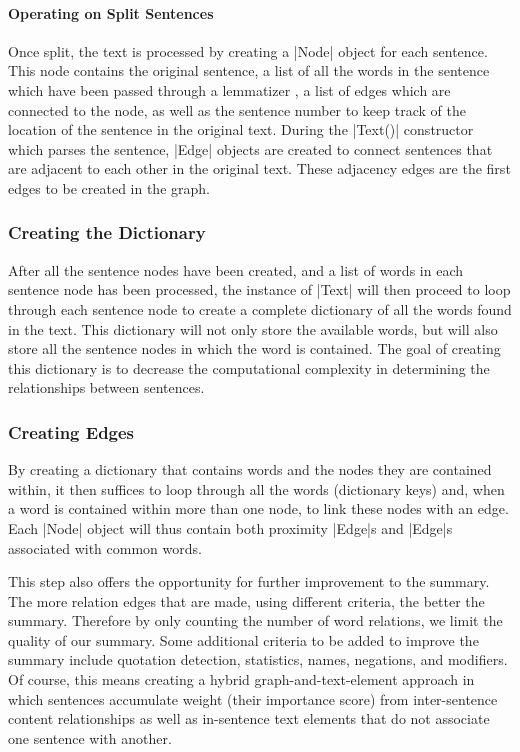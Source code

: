 	\paragraph{Operating on Split Sentences}
		Once split, the text is processed by creating a |Node| object for each sentence. This node contains the original sentence, a list of all the words in the sentence which have been passed through a lemmatizer \cite{nltk}, a list of edges which are connected to the node, as well as the sentence number to keep track of the location of the sentence in the original text. During the |Text()| constructor which parses the sentence, |Edge| objects are created to connect sentences that are adjacent to each other in the original text. These adjacency edges are the first edges to be created in the graph.
	
	\subsubsection{Creating the Dictionary}
		After all the sentence nodes have been created, and a list of words in each sentence node has been processed, the instance of |Text| will then proceed to loop through each sentence node to create a complete dictionary of all the words found in the text. This dictionary will not only store the available words, but will also store all the sentence nodes in which the word is contained. The goal of creating this dictionary is to decrease the computational complexity in determining the relationships between sentences. 
		
	\subsubsection{Creating Edges}
		By creating a dictionary that contains words and the nodes they are contained within, it then suffices to loop through all the words (\ie dictionary keys) and, when a word is contained within more than one node, to link these nodes with an edge. Each |Node| object will thus contain both proximity |Edge|s and |Edge|s associated with common words.
		
		This step also offers the opportunity for further improvement to the summary. The more relation edges that are made, using different criteria, the better the summary. Therefore by only counting the number of word relations, we limit the quality of our summary. Some additional criteria to be added to improve the summary include quotation detection, statistics, names, negations, and modifiers. Of course, this means creating a hybrid graph-and-text-element approach in which sentences accumulate weight (\ie their importance score) from inter-sentence content relationships as well as in-sentence text elements that do not associate one sentence with another.
		
